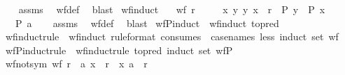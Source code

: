 \begin{isabellebody}
\ \ %
\endisadelimproof
%
\isatagproof
{}\isamarkupfalse%
\ assms\ \isamarkupfalse%
\ wf{\isacharunderscore}{\kern0pt}def\ \isamarkupfalse%
\ blast%
\endisatagproof
{\isafoldproof}%
%
\isadelimproof
\isanewline
%
\endisadelimproof
\isanewline
{}\isamarkupfalse%
\ wf{\isacharunderscore}{\kern0pt}induct{\isacharcolon}{\kern0pt}\isanewline
\ \ \ {\isachardoublequoteopen}wf\ r{\isachardoublequoteclose}\isanewline
\ \ \ \ \ {\isachardoublequoteopen}{\isasymAnd}x{\isachardot}{\kern0pt}\ {\isasymforall}y{\isachardot}{\kern0pt}\ {\isacharparenleft}{\kern0pt}y{\isacharcomma}{\kern0pt}\ x{\isacharparenright}{\kern0pt}\ {\isasymin}\ r\ {\isasymlongrightarrow}\ P\ y\ {\isasymLongrightarrow}\ P\ x{\isachardoublequoteclose}\isanewline
\ \ \ {\isachardoublequoteopen}P\ a{\isachardoublequoteclose}\isanewline
%
\isadelimproof
\ \ %
\endisadelimproof
%
\isatagproof
{}\isamarkupfalse%
\ assms\ \isamarkupfalse%
\ wf{\isacharunderscore}{\kern0pt}def\ \isamarkupfalse%
\ blast%
\endisatagproof
{\isafoldproof}%
%
\isadelimproof
\isanewline
%
\endisadelimproof
\isanewline
{}\isamarkupfalse%
\ wfP{\isacharunderscore}{\kern0pt}induct\ {\isacharequal}{\kern0pt}\ wf{\isacharunderscore}{\kern0pt}induct\ {\isacharbrackleft}{\kern0pt}to{\isacharunderscore}{\kern0pt}pred{\isacharbrackright}{\kern0pt}\isanewline
\isanewline
{}\isamarkupfalse%
\ wf{\isacharunderscore}{\kern0pt}induct{\isacharunderscore}{\kern0pt}rule\ {\isacharequal}{\kern0pt}\ wf{\isacharunderscore}{\kern0pt}induct\ {\isacharbrackleft}{\kern0pt}rule{\isacharunderscore}{\kern0pt}format{\isacharcomma}{\kern0pt}\ consumes\ {}{\isacharcomma}{\kern0pt}\ case{\isacharunderscore}{\kern0pt}names\ less{\isacharcomma}{\kern0pt}\ induct\ set{\isacharcolon}{\kern0pt}\ wf{\isacharbrackright}{\kern0pt}\isanewline
\isanewline
{}\isamarkupfalse%
\ wfP{\isacharunderscore}{\kern0pt}induct{\isacharunderscore}{\kern0pt}rule\ {\isacharequal}{\kern0pt}\ wf{\isacharunderscore}{\kern0pt}induct{\isacharunderscore}{\kern0pt}rule\ {\isacharbrackleft}{\kern0pt}to{\isacharunderscore}{\kern0pt}pred{\isacharcomma}{\kern0pt}\ induct\ set{\isacharcolon}{\kern0pt}\ wfP{\isacharbrackright}{\kern0pt}\isanewline
\isanewline
{}\isamarkupfalse%
\ wf{\isacharunderscore}{\kern0pt}not{\isacharunderscore}{\kern0pt}sym{\isacharcolon}{\kern0pt}\ {\isachardoublequoteopen}wf\ r\ {\isasymLongrightarrow}\ {\isacharparenleft}{\kern0pt}a{\isacharcomma}{\kern0pt}\ x{\isacharparenright}{\kern0pt}\ {\isasymin}\ r\ {\isasymLongrightarrow}\ {\isacharparenleft}{\kern0pt}x{\isacharcomma}{\kern0pt}\ a{\isacharparenright}{\kern0pt}\ {\isasymnotin}\ r{\isachardoublequoteclose}\isanewline

\end{isabellebody}
